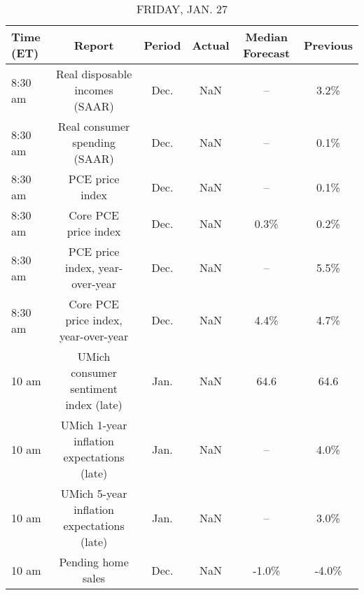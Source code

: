 \documentclass{article}%
\begin{document}
\begin{table}[htbp]%
\caption{FRIDAY, JAN. 27}%
\centering%
\begin{adjustbox}{width=1\textwidth}%
\begin{tabular}{lccccc}
\toprule
Time (ET) &                                     Report & Period & Actual & Median Forecast & Previous \\
\midrule
  8:30 am &             Real disposable incomes (SAAR) &   Dec. &    NaN &              -- &     3.2\% \\
  8:30 am &              Real consumer spending (SAAR) &   Dec. &    NaN &              -- &     0.1\% \\
  8:30 am &                            PCE price index &   Dec. &    NaN &              -- &     0.1\% \\
  8:30 am &                       Core PCE price index &   Dec. &    NaN &            0.3\% &     0.2\% \\
  8:30 am &            PCE price index, year-over-year &   Dec. &    NaN &              -- &     5.5\% \\
  8:30 am &       Core PCE price index, year-over-year &   Dec. &    NaN &            4.4\% &     4.7\% \\
    10 am &      UMich consumer sentiment index (late) &   Jan. &    NaN &            64.6 &     64.6 \\
    10 am & UMich 1-year inflation expectations (late) &   Jan. &    NaN &              -- &     4.0\% \\
    10 am & UMich 5-year inflation expectations (late) &   Jan. &    NaN &              -- &     3.0\% \\
    10 am &                         Pending home sales &   Dec. &    NaN &           -1.0\% &    -4.0\% \\
\bottomrule
\end{tabular}
%
\end{adjustbox}%
\end{table}
\end{document}
